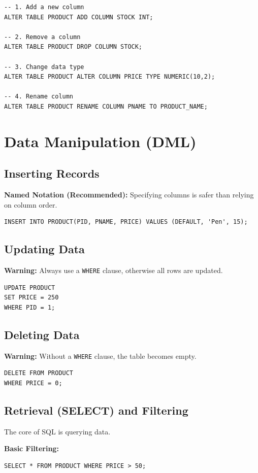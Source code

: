 \documentclass[12pt,a4paper]{article}
\begin{document}
\begin{lstlisting}
-- 1. Add a new column
ALTER TABLE PRODUCT ADD COLUMN STOCK INT;

-- 2. Remove a column
ALTER TABLE PRODUCT DROP COLUMN STOCK;

-- 3. Change data type
ALTER TABLE PRODUCT ALTER COLUMN PRICE TYPE NUMERIC(10,2);

-- 4. Rename column
ALTER TABLE PRODUCT RENAME COLUMN PNAME TO PRODUCT_NAME;
\end{lstlisting}

\section{Data Manipulation (DML)}

\subsection{Inserting Records}
\textbf{Named Notation (Recommended):}
Specifying columns is safer than relying on column order.
\begin{lstlisting}
INSERT INTO PRODUCT(PID, PNAME, PRICE) VALUES (DEFAULT, 'Pen', 15);
\end{lstlisting}

\subsection{Updating Data}
\textbf{Warning:} Always use a \texttt{WHERE} clause, otherwise all rows are updated.
\begin{lstlisting}
UPDATE PRODUCT
SET PRICE = 250
WHERE PID = 1;
\end{lstlisting}

\subsection{Deleting Data}
\textbf{Warning:} Without a \texttt{WHERE} clause, the table becomes empty.
\begin{lstlisting}
DELETE FROM PRODUCT
WHERE PRICE = 0;
\end{lstlisting}

\subsection{Retrieval (SELECT) and Filtering}
The core of SQL is querying data.

\textbf{Basic Filtering:}
\begin{lstlisting}
SELECT * FROM PRODUCT WHERE PRICE > 50;
\end{lstlisting}
\end{document}
